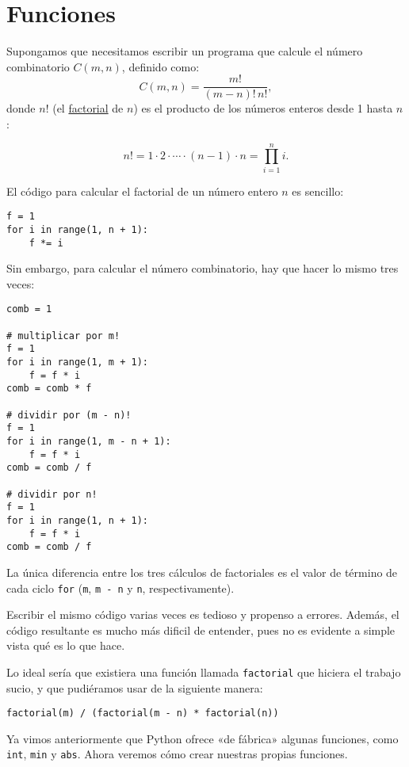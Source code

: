 \chapter{Funciones}

Supongamos que necesitamos escribir un programa que calcule el
  número combinatorio
\(C(m, n)\), definido como:
\[C(m, n) = \frac{m!}{(m - n)!\,n!},\]
donde \(n!\) (el \href{http://es.wikipedia.org/wiki/Factorial}{factorial}
de \(n\)) es el producto de los números enteros desde 1 hasta \(n\):

\[n! = 1\cdot 2\cdot\cdots\cdot(n - 1)\cdot n = \prod_{i=1}^n i.\]

El código para calcular el factorial de un número entero \(n\) es
sencillo:

\begin{lstlisting}
f = 1
for i in range(1, n + 1):
    f *= i
\end{lstlisting}

Sin embargo, para calcular el número combinatorio, hay que hacer lo
mismo tres veces:

\begin{lstlisting}
comb = 1

# multiplicar por m!
f = 1
for i in range(1, m + 1):
    f = f * i
comb = comb * f

# dividir por (m - n)!
f = 1
for i in range(1, m - n + 1):
    f = f * i
comb = comb / f

# dividir por n!
f = 1
for i in range(1, n + 1):
    f = f * i
comb = comb / f
\end{lstlisting}

La única diferencia entre los tres cálculos de factoriales es el valor
de término de cada ciclo \lstinline!for! (\lstinline!m!,
\lstinline!m - n! y \lstinline!n!, respectivamente).

Escribir el mismo código varias veces es tedioso y propenso a errores.
Además, el código resultante es mucho más dificil de entender, pues no
es evidente a simple vista qué es lo que hace.

Lo ideal sería que existiera una función llamada \lstinline!factorial!
que hiciera el trabajo sucio, y que pudiéramos usar de la siguiente
manera:

\begin{lstlisting}
factorial(m) / (factorial(m - n) * factorial(n))
\end{lstlisting}

Ya vimos anteriormente que Python ofrece «de fábrica» algunas funciones,
como \lstinline!int!, \lstinline!min! y \lstinline!abs!. Ahora veremos
cómo crear nuestras propias funciones.

